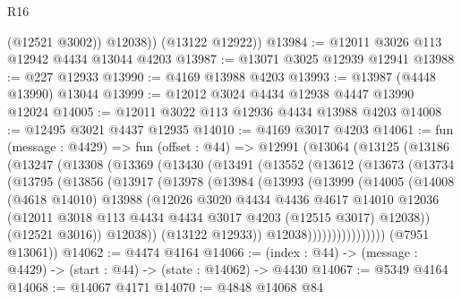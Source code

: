 \begin{lexlean}{R16}
\begin{coremodule}
            (@12521 @3002))
          @12038))
      (@13122 @12922))
@13984 := @12011 @3026 @113 @12942 @4434 @13044 @4203
@13987 := @13071 @3025 @12939 @12941
@13988 := @227 @12933
@13990 := @4169 @13988 @4203
@13993 := @13987 (@4448 @13990) @13044
@13999 := @12012 @3024 @4434 @12938 @4447 @13990 @12024
@14005 := @12011 @3022 @113 @12936 @4434 @13988 @4203
@14008 := @12495 @3021 @4437 @12935
@14010 := @4169 @3017 @4203
@14061 := fun (message : @4429) =>
  fun (offset : @44) =>
  @12991
    (@13064
      (@13125
        (@13186
          (@13247
            (@13308
              (@13369
                (@13430
                  (@13491
                    (@13552
                      (@13612
                        (@13673
                          (@13734
                            (@13795
                              (@13856
                                (@13917
                                  (@13978
                                    (@13984
                                      (@13993
                                        (@13999
                                          (@14005
                                            (@14008
                                              (@4618 @14010)
                                              @13988
                                              (@12026
                                                @3020
                                                @4434
                                                @4436
                                                @4617
                                                @14010
                                                @12036
                                                (@12011
                                                  @3018
                                                  @113
                                                  @4434
                                                  @4434
                                                  @3017
                                                  @4203
                                                  (@12515 @3017)
                                                  @12038))
                                              (@12521 @3016))
                                            @12038))
                                        (@13122 @12933))
                                      @12038))))))))))))))))
      (@7951 @13061))
@14062 := @4474 @4164
@14066 := (index : @44) -> (message : @4429) -> (start : @44) -> (state : @14062) -> @4430
@14067 := @5349 @4164
@14068 := @14067 @4171
@14070 := @4848 @14068 @84

\end{coremodule}
\end{lexlean}
